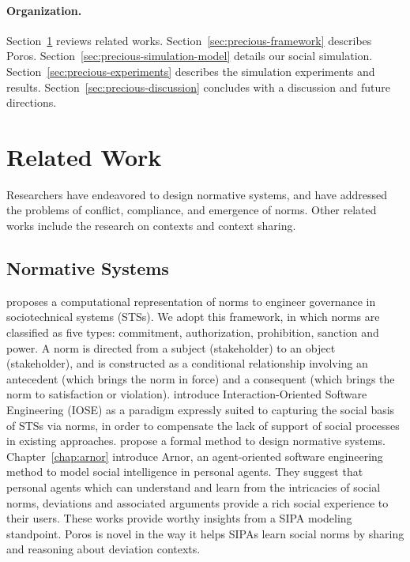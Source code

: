 \documentclass[11pt,          %
               phd,           %
               onehalfspacing %
               ]{ncsuthesis}
\newcommand{\frameworkB}{Poros\xspace}
\begin{document}
\paragraph{Organization.}
Section~\ref{sec:precious-related-work} reviews related works.
Section~\ref{sec:precious-framework} describes \frameworkB.
Section~\ref{sec:precious-simulation-model} details our social simulation.
Section~\ref{sec:precious-experiments} describes the simulation experiments and
results. Section~\ref{sec:precious-discussion} concludes with a discussion and
future directions.

\section{Related Work}
\label{sec:precious-related-work}

Researchers have endeavored to design normative systems, and have
addressed the problems of conflict, compliance, and emergence of norms.
Other related works include the research on contexts and context sharing. 

\subsection{Normative Systems}

\citet{Singh-2013-Norms} proposes a computational representation of norms
to engineer governance in sociotechnical systems (STSs). We adopt this
framework, in which norms are classified as five types: commitment,
authorization, prohibition, sanction and power. A norm is directed from
a subject (stakeholder) to an object (stakeholder), and is constructed
as a conditional relationship involving an antecedent (which brings the
norm in force) and a consequent (which brings the norm to satisfaction
or violation). \citet{WWW-16:IOSE} introduce
Interaction-Oriented Software Engineering (IOSE) as a paradigm expressly
suited to capturing the social basis of STSs via norms, in order to
compensate the lack of support of social processes in existing
approaches. \citet{Hao-FSE16-Norms+formal} propose a formal
method to design normative systems. 
Chapter~\ref{chap:arnor} introduce Arnor, an agent-oriented software
engineering method to model social intelligence in personal agents. They
suggest that personal agents which can understand and learn from the
intricacies of social norms, deviations and associated arguments provide
a rich social experience to their users. These works provide worthy
insights from a SIPA modeling standpoint. \frameworkB is novel in the
way it helps SIPAs learn social norms by sharing and reasoning about
deviation contexts.
\end{document}
